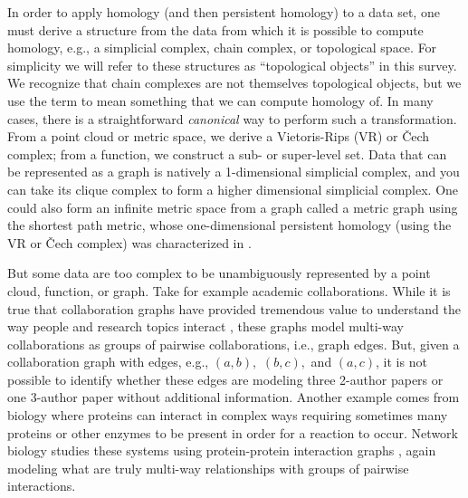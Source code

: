 \documentclass{amsart}
\begin{document}
In order to apply homology (and then persistent homology) to a data set, one must derive a structure from the data from which it is possible to compute homology, e.g., a simplicial complex, chain complex, or topological space.
For simplicity we will refer to these structures as ``topological objects'' in this survey. We recognize that chain complexes are not themselves topological objects, but we use the term to mean something that we can compute homology of.
In many cases, there is a straightforward \emph{canonical} way to perform such a transformation.
From a point cloud or metric space, we derive a Vietoris-Rips (VR) or \v{C}ech complex; from a function, we construct a sub- or super-level set.
Data that can be represented as a graph is natively a 1-dimensional simplicial complex, and you can take its clique complex to form a higher dimensional simplicial complex.
One could also form an infinite metric space from a graph called a metric graph using the shortest path metric, whose one-dimensional persistent homology (using the VR or \v{C}ech complex) was characterized in \cite{gasparovic2018complete}.

But some data are too complex to be unambiguously represented by a point cloud, function, or graph.
Take for example academic collaborations.
While it is true that collaboration graphs have provided tremendous value to understand the way people and research topics interact \cite{batagelj2000some,newman2001structure,newman2004best}, these graphs model multi-way collaborations as groups of pairwise collaborations, i.e., graph edges.
But, given a collaboration graph with edges, e.g., $(a,b),$ $(b,c),$ and $(a,c)$, it is not possible to identify whether these edges are modeling three 2-author papers or one 3-author paper without additional information.
Another example comes from biology where proteins can interact in complex ways requiring sometimes many proteins or other enzymes to be present in order for a reaction to occur.
Network biology studies these systems using protein-protein interaction graphs \cite{stelzl2005human}, again modeling what are truly multi-way relationships with groups of pairwise interactions.
\end{document}
